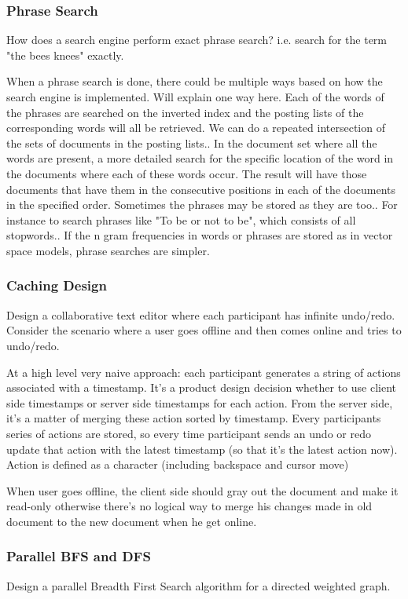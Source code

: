 \subsubsection{Phrase Search}
How does a search engine perform exact phrase search? i.e. search for the term "the bees knees" exactly.

When a phrase search is done, there could be multiple ways based on how the search engine is implemented. Will explain one way here. 
Each of the words of the phrases are searched on the inverted index and the posting lists of the corresponding words will all be retrieved. We can do a repeated intersection of 
the sets of documents in the posting lists.. 
In the document set where all the words are present, a more detailed search for the specific location of the word in the documents where each of these words occur. The result will 
have those documents that have them in the consecutive positions in each of the documents in the specified order. 
Sometimes the phrases may be stored as they are too.. For instance to search phrases like "To be or not to be", which consists of all stopwords.. 
If the n gram frequencies in words or phrases are stored as in vector space models, phrase searches are simpler.

\subsubsection{Caching Design}

Design a collaborative text editor where each participant has infinite undo/redo. Consider the scenario where a user goes offline and then comes online and tries to undo/redo.

At a high level very naive approach: each participant generates a string of actions associated with a timestamp. It's a product design decision whether to use client side 
timestamps or server side timestamps for each action. From the server side, it's a matter of merging these action sorted by timestamp. Every participants series of actions are 
stored, so every time participant sends an undo or redo update that action with the latest timestamp (so that it's the latest action now). Action is defined as a character 
(including backspace and cursor move)

When user goes offline, the client side should gray out the document and make it read-only otherwise there's no logical way to merge his changes made in old document to the new 
document when he get online. 

\subsubsection{Parallel BFS and DFS}
Design a parallel Breadth First Search algorithm for a directed weighted graph. 

